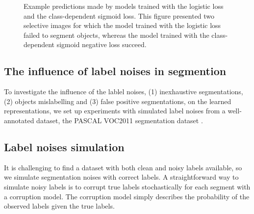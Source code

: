 \begin{figure}
\begin{minipage}{\columnwidth}
  \end{minipage}
\caption{
Example predictions made by models trained with the logistic loss and the class-dependent sigmoid loss.
This figure presented two selective images for which the model trained with the logistic loss failed to segment objects, whereas the model trained with the class-dependent sigmoid negative loss succeed.
}
\label{fig:pusegment}
\end{figure}

\subsection{The influence of label noises in segmention}
\label{subsec:robustness}


To investigate the influence of the lablel noises, (1) inexhaustive segmentations, (2) objects mislabelling and (3) false positive segmentations, on the learned representations, we set up experiments with simulated label noises from a well-annotated dataset, the PASCAL VOC2011 segmentation dataset \cite{everingham2015pascal}.


\subsection{Label noises simulation}
\label{subsec:noises}

It is challenging to find a dataset with both clean and noisy labels available, so we simulate segmentation noises with correct labels.
A straightforward way to simulate noisy labels is to corrupt true labels stochastically for each segment with a corruption model.
The corruption model simply describes the probability of the observed labels given the true labels.

